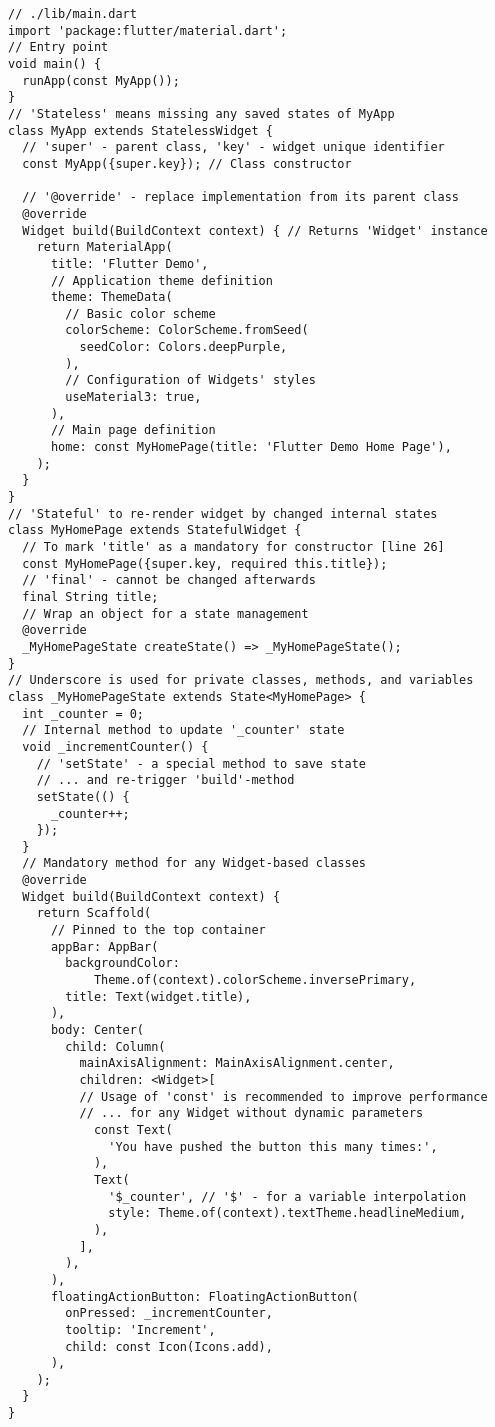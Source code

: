 \begin{lstlisting}
// ./lib/main.dart
import 'package:flutter/material.dart';
// Entry point
void main() {
  runApp(const MyApp());
}
// 'Stateless' means missing any saved states of MyApp
class MyApp extends StatelessWidget {
  // 'super' - parent class, 'key' - widget unique identifier
  const MyApp({super.key}); // Class constructor
  
  // '@override' - replace implementation from its parent class
  @override
  Widget build(BuildContext context) { // Returns 'Widget' instance
    return MaterialApp(
      title: 'Flutter Demo',
      // Application theme definition
      theme: ThemeData(
        // Basic color scheme
        colorScheme: ColorScheme.fromSeed(
          seedColor: Colors.deepPurple,
        ),
        // Configuration of Widgets' styles
        useMaterial3: true,
      ),
      // Main page definition
      home: const MyHomePage(title: 'Flutter Demo Home Page'),
    );
  }
}
// 'Stateful' to re-render widget by changed internal states
class MyHomePage extends StatefulWidget {
  // To mark 'title' as a mandatory for constructor [line 26]
  const MyHomePage({super.key, required this.title});
  // 'final' - cannot be changed afterwards
  final String title;
  // Wrap an object for a state management
  @override
  _MyHomePageState createState() => _MyHomePageState();
}
// Underscore is used for private classes, methods, and variables
class _MyHomePageState extends State<MyHomePage> {
  int _counter = 0;
  // Internal method to update '_counter' state
  void _incrementCounter() {
    // 'setState' - a special method to save state
    // ... and re-trigger 'build'-method
    setState(() {
      _counter++;
    });
  }
  // Mandatory method for any Widget-based classes
  @override
  Widget build(BuildContext context) {
    return Scaffold(
      // Pinned to the top container
      appBar: AppBar(
        backgroundColor:
            Theme.of(context).colorScheme.inversePrimary,
        title: Text(widget.title),
      ),
      body: Center(
        child: Column(
          mainAxisAlignment: MainAxisAlignment.center,
          children: <Widget>[
          // Usage of 'const' is recommended to improve performance
          // ... for any Widget without dynamic parameters
            const Text(
              'You have pushed the button this many times:',
            ),
            Text(
              '$_counter', // '$' - for a variable interpolation
              style: Theme.of(context).textTheme.headlineMedium,
            ),
          ],
        ),
      ),
      floatingActionButton: FloatingActionButton(
        onPressed: _incrementCounter,
        tooltip: 'Increment',
        child: const Icon(Icons.add),
      ),
    );
  }
}
\end{lstlisting}

